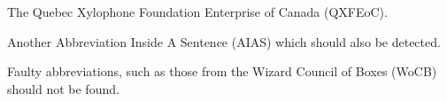 \documentclass{article}
\begin{document}
The Quebec Xylophone Foundation Enterprise of Canada (QXFEoC).

Another Abbreviation Inside A Sentence (AIAS) which should also be detected.

Faulty abbreviations, such as those from the Wizard Council of Boxes (WoCB) should not be found.
\end{document}
